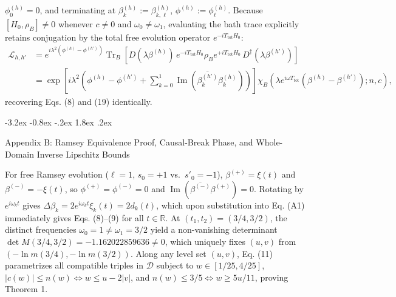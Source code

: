 \documentclass[11pt,letterpaper]{article}
\makeatletter
\renewcommand\section{\@startsection{section}{1}{\z@}%
  {-3.2ex \@plus -0.8ex \@minus -.2ex}%
  {1.8ex \@plus .2ex}%
  {\normalfont\Large\bfseries\raggedright\hyphenpenalty=10000}}
\theoremstyle{definition}
\makeatother
\begin{document}
\(\phi_{0}^{(h)} = 0\), and terminating at
\(\beta_k^{(h)} := \beta_{k,\ell}^{(h)}\),
\(\phi^{(h)} := \phi_{\ell}^{(h)}\). Because \([H_0, \rho_B] \neq 0\)
whenever \(c \neq 0\) and \(\omega_0 \neq \omega_1\), evaluating the
bath trace explicitly retains conjugation by the total free evolution
operator \(e^{-i T_{\mathrm{tot}} H_0}\): \[\begin{aligned}
\mathcal{L}_{h, h'} &= e^{i\lambda^2(\phi^{(h)} - \phi^{(h')})} \operatorname{Tr}_B\!\left[D(\lambda\beta^{(h)})\, e^{-i T_{\mathrm{tot}} H_0}\rho_B e^{+i T_{\mathrm{tot}} H_0}\, D^\dagger(\lambda\beta^{(h')})\right] \\
&= \exp\!\left[i\lambda^2\!\left(\phi^{(h)} - \phi^{(h')} + \sum_{k=0}^{1}\operatorname{Im}\!\left(\overline{\beta_k^{(h')}}\beta_k^{(h)}\right)\right)\right]\chi_B\!\left(\lambda e^{i\omega T_{\mathrm{tot}}}(\beta^{(h)} - \beta^{(h')}); n, c\right),
\end{aligned}\] recovering Eqs. (8) and (19) identically.

\section{Appendix B: Ramsey Equivalence Proof, Causal-Break Phase, and
Whole-Domain Inverse Lipschitz
Bounds}\label{appendix-b-ramsey-equivalence-proof-causal-break-phase-and-whole-domain-inverse-lipschitz-bounds}

For free Ramsey evolution (\(\ell = 1\), \(s_0 = +1\)
vs.~\(s'_0 = -1\)), \(\beta^{(+)} = \xi(t)\) and
\(\beta^{(-)} = -\xi(t)\), so \(\phi^{(+)} = \phi^{(-)} = 0\) and
\(\operatorname{Im}(\overline{\beta^{(-)}}\beta^{(+)}) = 0\). Rotating
by \(e^{i\omega_k t}\) gives
\(\Delta\beta_k = 2 e^{i\omega_k t}\xi_k(t) = 2 d_k(t)\), which upon
substitution into Eq. (A1) immediately gives Eqs. (8)--(9) for all
\(t \in \mathbb{R}\). At \((t_1, t_2) = (3/4, 3/2)\), the distinct
frequencies \(\omega_0 = 1 \neq \omega_1 = 3/2\) yield a non-vanishing
determinant \(\det M(3/4, 3/2) = -1.162022859636 \neq 0\), which
uniquely fixes \((u, v)\) from \((-\ln m(3/4), -\ln m(3/2))\). Along any
level set \((u, v)\), Eq. (11) parametrizes all compatible triples in
\(\mathcal{D}\) subject to \(w \in [1/25, 4/25]\),
\(|c(w)| \le n(w) \iff w \le u - 2|v|\), and
\(n(w) \le 3/5 \iff w \ge 5u/11\), proving Theorem 1.
\end{document}
